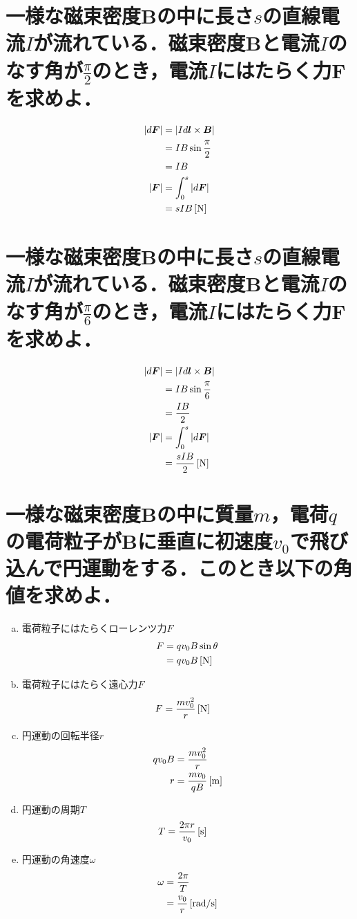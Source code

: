 \documentclass[dvipdfmx]{ujarticle}
\begin{document}
\section{一様な磁束密度$\boldsymbol{B}$の中に長さ$s$の直線電流$I$が流れている．磁束密度$\boldsymbol{B}$と電流$I$のなす角が$\frac{\pi}{2}$のとき，電流$I$にはたらく力$\boldsymbol{F}$を求めよ．}
\begin{align*}
	|d\boldsymbol{F}|&=|Id\boldsymbol{l}\times \boldsymbol{B}|\\
	&=IB\sin \frac{\pi}{2}\\
	&=IB\\
	|\boldsymbol{F}|&=\int_{0}^{s} |d\boldsymbol{F}|\\
	&=sIB\,[\rm{N}]
\end{align*}
\section{一様な磁束密度$\boldsymbol{B}$の中に長さ$s$の直線電流$I$が流れている．磁束密度$\boldsymbol{B}$と電流$I$のなす角が$\frac{\pi}{6}$のとき，電流$I$にはたらく力$\boldsymbol{F}$を求めよ．}
\begin{align*}
	|d\boldsymbol{F}|&=|Id\boldsymbol{l}\times \boldsymbol{B}|\\
	&=IB\sin \frac{\pi}{6}\\
	&=\frac{IB}{2}\\
	|\boldsymbol{F}|&=\int_{0}^{s} |d\boldsymbol{F}|\\
	&=\frac{sIB}{2}\,[\rm{N}]
\end{align*}

\section{一様な磁束密度$\boldsymbol{B}$の中に質量$m$，電荷$q$の電荷粒子が$\boldsymbol{B}$に垂直に初速度$v_{0}$で飛び込んで円運動をする．このとき以下の角値を求めよ．}
\begin{enumerate}[(a)]
	\item 電荷粒子にはたらくローレンツ力$F$
	\begin{align*}
		F&=qv_{0}B\sin \theta \\
		&=qv_{0}B\,[\rm{N}]
	\end{align*}
	\item 電荷粒子にはたらく遠心力$F$
	\begin{align*}
		F&=\frac{mv_{0}^{2}}{r}\,[\rm{N}]
	\end{align*}
	\item 円運動の回転半径$r$
	\begin{align*}
		qv_{0}B&=\frac{mv_{0}^{2}}{r}\\
		r&=\frac{mv_{0}}{qB}\,[\rm{m}]
	\end{align*}
	\item 円運動の周期$T$
	\begin{align*}
		T&=\frac{2\pi r}{v_{0}}\,[\rm{s}]
	\end{align*}
	\item 円運動の角速度$\omega$
	\begin{align*}
		\omega &=\frac{2\pi}{T}\\
		&=\frac{v_{0}}{r}\,[\rm{rad/s}]
	\end{align*}
\end{enumerate}
\end{document}
